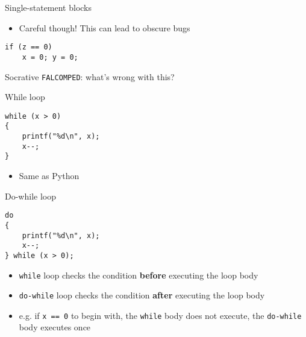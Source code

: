 \begin{frame}[fragile]{Single-statement blocks}
    \begin{itemize}
        \item Careful though! This can lead to obscure bugs
    \end{itemize}
    \begin{lstlisting}
if (z == 0)
    x = 0; y = 0;
    \end{lstlisting}
		Socrative \texttt{FALCOMPED}: what's wrong with this?
\end{frame}


\begin{frame}[fragile]{While loop}
	\begin{lstlisting}
while (x > 0)
{
    printf("%d\n", x);
    x--;
}
	\end{lstlisting}
    \begin{itemize}
        \item Same as Python
    \end{itemize}
\end{frame}

\begin{frame}[fragile]{Do-while loop}
	\begin{lstlisting}
do
{
    printf("%d\n", x);
    x--;
} while (x > 0);
	\end{lstlisting}
	\pause
	\begin{itemize}
		\item \lstinline{while} loop checks the condition \textbf{before} executing the loop body \pause
		\item \lstinline{do-while} loop checks the condition \textbf{after} executing the loop body \pause
		\item e.g. if \lstinline{x == 0} to begin with, the \lstinline{while} body does not execute, the \lstinline{do-while} body executes once
	\end{itemize}
\end{frame}


